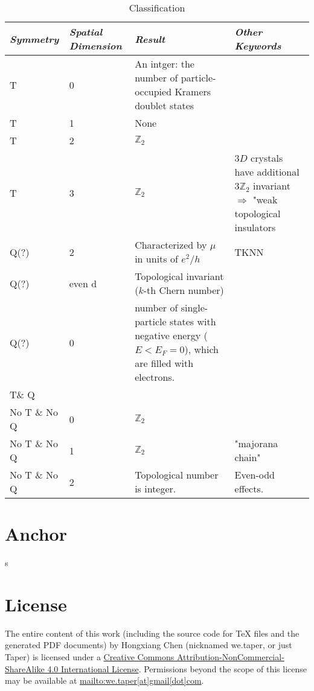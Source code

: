 \documentclass{article}
\begin{document}
\begin{table}[ht]
	\centering
	\caption{Classification}
	\label{tab:classification}
	\vspace{+0.5pt}
	\tabulinesep=1.2mm
	\begin{tabu}{  X[l] X[l] X[l] X[l] }
		\textit{Symmetry} & \textit{Spatial Dimension} &
		\textit{Result} & \textit{Other Keywords} \\
		\hline
		T & 0 & An intger: the number of particle-occupied Kramers
		doublet states & \\
		T & 1 & None & \\
		T & 2 & $\mathbb{Z}_2$ & \\
		T & 3 & $\mathbb{Z}_2$ & $3D$ crystals have additional
		$3\mathbb{Z}_2$ invariant$ \Rightarrow$ "weak topological
		insulators \\
		Q(?) & 2 & Characterized by $\mu$ in units of $e^2/h$ & TKNN \\
		Q(?) & even  d & Topological invariant ($k$-th Chern number) \\
		Q(?) & 0 &  number of single-particle states with negative
		energy ($E< E_F = 0$), which are filled with electrons. \\
		T\& Q \\
		No T \& No Q & 0 & $\mathbb{Z}_2$ \\
		No T \& No Q & 1 &$\mathbb{Z}_2$ &"majorana chain"  \\
		No T \& No Q & 2 & Topological number is integer. & Even-odd
		effects. \\
		\bottomrule
	\end{tabu}
\end{table}
\section{Anchor}
\label{sec:Anchor}

\begin{thebibliography}{1}
      s
\end{thebibliography}
\printnomenclature
\section{License}
The entire content of this work (including the source code
for TeX files and the generated PDF documents) by 
Hongxiang Chen (nicknamed we.taper, or just Taper) is
licensed under a 
\href{http://creativecommons.org/licenses/by-nc-sa/4.0/}{Creative 
Commons Attribution-NonCommercial-ShareAlike 4.0 International 
License}. Permissions beyond the scope of this 
license may be available at \url{mailto:we.taper[at]gmail[dot]com}.
\end{document}

